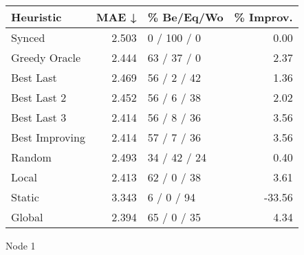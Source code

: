 \begin{tabular}{lrlr}
\toprule
\textbf{Heuristic} & \textbf{MAE ↓} & \textbf{\% Be/Eq/Wo} & \textbf{\% Improv.} \\
\midrule
            Synced &          2.503 &          0 / 100 / 0 &                0.00 \\
     Greedy Oracle &          2.444 &          63 / 37 / 0 &                2.37 \\
         Best Last &          2.469 &          56 / 2 / 42 &                1.36 \\
       Best Last 2 &          2.452 &          56 / 6 / 38 &                2.02 \\
       Best Last 3 &          2.414 &          56 / 8 / 36 &                3.56 \\
    Best Improving &          2.414 &          57 / 7 / 36 &                3.56 \\
            Random &          2.493 &         34 / 42 / 24 &                0.40 \\
             Local &          2.413 &          62 / 0 / 38 &                3.61 \\
            Static &          3.343 &           6 / 0 / 94 &              -33.56 \\
            Global &          2.394 &          65 / 0 / 35 &                4.34 \\
\bottomrule
\end{tabular}
\caption{Node 1}
\label{tab:hr_non_lr01_le1_bs4_1}
